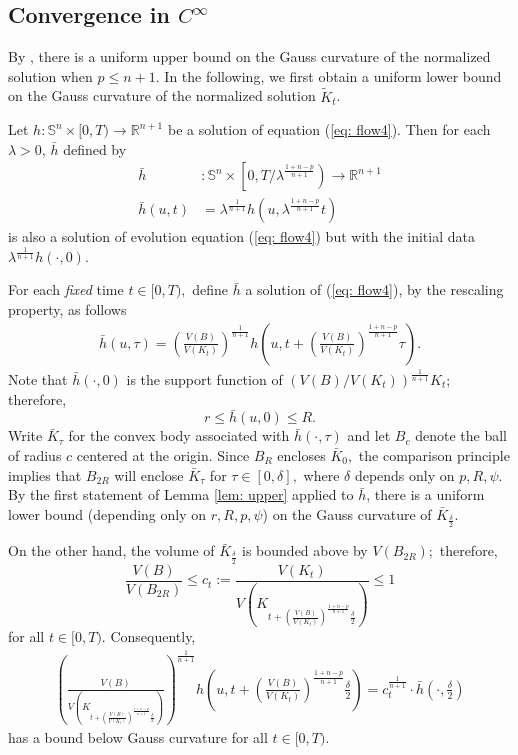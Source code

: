 \documentclass{amsart}
\theoremstyle{definition}
\theoremstyle{remark}
\numberwithin{equation}{section}
\begin{document}
\subsection{Convergence in $C^{\infty}$}
By \cite[Lemma 9.2]{Ivaki 2014-gauss}, there is a uniform upper bound on the Gauss curvature of the normalized solution when $p\leq n+1.$
In the following, we first obtain a uniform lower bound on the Gauss curvature of the normalized solution $\tilde{K}_t$.


Let $h:\mathbb{S}^{n}\times[0,T)\to\mathbb{R}^{n+1}$ be a solution of equation (\ref{eq: flow4}). Then for each $\lambda >0$, $\bar{h}$ defined by
\begin{align*}
\bar{h}&:\mathbb{S}^{n}\times\left[0,T/\lambda^{\frac{1+n-p}{n+1}}\right)\to\mathbb{R}^{n+1}\\
\bar{h}(u,t)&=\lambda^{\frac{1}{n+1}} h\left(u,\lambda^{\frac{1+n-p}{n+1}}t\right)
\end{align*}
is also a solution of evolution equation (\ref{eq: flow4}) but with the initial data $\lambda^{\frac{1}{n+1}} h\left(\cdot,0\right).$

For each \emph{fixed} time $t\in[0,T),$ define $\bar{h}$ a solution of (\ref{eq: flow4}), by the rescaling property, as follows
\begin{align*}
\bar{h}(u,\tau)=\left(\frac{V(B)}{V(K_t)}\right)^{\frac{1}{n+1}}h\left(u,
t+\left(\frac{V(B)}{V(K_t)}\right)^{\frac{1+n-p}{n+1}}\tau\right).
\end{align*}
Note that $\bar{h}(\cdot,0)$ is the support function of $\left(V(B)/V(K_t)\right)^{\frac{1}{n+1}}K_t$; therefore,
\[r\leq \bar{h}(u,0)\leq R.\]
Write $\bar{K}_{\tau}$ for the convex body associated with $\bar{h}(\cdot,\tau)$ and let $B_c$ denote the ball of radius $c$ centered at the origin. Since $B_{R}$ encloses
$\bar{K}_0,$ the comparison principle implies that $B_{2R}$
will enclose $\bar{K}_{\tau}$ for $\tau\in[0,\delta],$
where $\delta$ depends only on $p,R,\psi$. By the first statement of Lemma \ref{lem: upper} applied to $\bar{h}$, there is a uniform lower bound (depending only on $r,R,p,\psi$) on the Gauss curvature of $\bar{K}_{\frac{\delta}{2}}.$

On the other hand, the volume of $\bar{K}_{\frac{\delta}{2}}$ is bounded above by $V(B_{2R});$ therefore,
\[\displaystyle\frac{V(B)}{V(B_{2R})}\leq c_t:=\frac{V(K_t)}{V\left(K_{t+\left(\frac{V(B)}{V(K_t)}\right)^{\frac{1+n-p}{n+1}}\frac{\delta}{2}}\right)}\leq 1\]
for all $t\in [0,T)$. Consequently,
\begin{align*}
\left(\frac{V(B)}{V\left(K_{t+\left(\frac{V(B)}{V(K_t)}\right)^{\frac{1+n-p}{n+1}}\frac{\delta}{2}}\right)}\right)^{\frac{1}{n+1}}h\left(u,
t+\left(\frac{V(B)}{V(K_t)}\right)^{\frac{1+n-p}{n+1}}\frac{\delta}{2}\right)
=c_t^{\frac{1}{n+1}}\cdot\bar{h}(\cdot,\frac{\delta}{2})
\end{align*}
has a bound below Gauss curvature for all $t\in [0,T)$.
\end{document}
